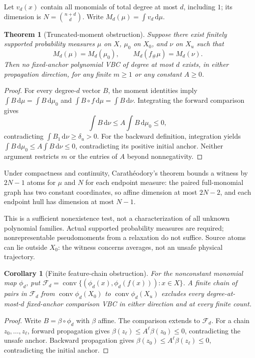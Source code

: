 \documentclass[journal,10pt]{IEEEtran}
\newtheorem{theorem}{Theorem}
\newtheorem{corollary}{Corollary}
\theoremstyle{definition}\newtheorem{definition}{Definition}
\theoremstyle{remark}
\newcommand{\co}{\operatorname{conv}}
\newcommand{\F}{\mathcal F_d}
\newcommand{\dd}{\,\mathrm d}
\begin{document}
Let $v_d(x)$ contain all monomials of total degree at most $d$, including $1$; its dimension is $N=\binom{n+d}{d}$. Write $M_d(\mu)=\int v_d\dd\mu$.
\begin{theorem}[Truncated-moment obstruction]\label{th:moment}
Suppose there exist finitely supported probability measures $\mu$ on $X$, $\mu_0$ on $X_0$, and $\nu$ on $X_u$ such that
\begin{equation}\label{eq:moments}
 M_d(\mu)=M_d(\mu_0),\qquad M_d(f_\#\mu)=M_d(\nu).
\end{equation}
Then no fixed-anchor polynomial VBC of degree at most $d$ exists, in either propagation direction, for any finite $m\geq1$ or any constant $A\geq0$.
\end{theorem}
\begin{proof}
For every degree-$d$ vector $B$, the moment identities imply $\int B\dd\mu=\int B\dd\mu_0$ and $\int B\circ f\dd\mu=\int B\dd\nu$. Integrating the forward comparison gives
\[
 \int B\dd\nu\leq A\int B\dd\mu_0\leq0,
\]
contradicting $\int B_1\dd\nu\geq\delta_u>0$. For the backward definition, integration yields $\int B\dd\mu_0\leq A\int B\dd\nu\leq0$, contradicting its positive initial anchor. Neither argument restricts $m$ or the entries of $A$ beyond nonnegativity.
\end{proof}


Under compactness and continuity, Carath\'eodory's theorem bounds a witness by $2N-1$ atoms for $\mu$ and $N$ for each endpoint measure: the paired full-monomial graph has two constant coordinates, so affine dimension at most $2N-2$, and each endpoint hull has dimension at most $N-1$.

This is a sufficient nonexistence test, not a characterization of all unknown polynomial families. Actual supported probability measures are required; nonrepresentable pseudomoments from a relaxation do not suffice. Source atoms can lie outside $X_0$: the witness concerns averages, not an unsafe physical trajectory.

\begin{corollary}[Finite feature-chain obstruction]\label{cor:chain}
For the nonconstant monomial map $\phi_d$, put $\F=\co\{(\phi_d(x),\phi_d(f(x))):x\in X\}$. A finite chain of pairs in $\F$ from $\co\phi_d(X_0)$ to $\co\phi_d(X_u)$ excludes every degree-at-most-$d$ fixed-anchor comparison VBC in either direction and at every finite count.
\end{corollary}
\begin{proof}
Write $B=\beta\circ\phi_d$ with $\beta$ affine. The comparison extends to $\F$. For a chain $z_0,\ldots,z_\ell$, forward propagation gives $\beta(z_\ell)\leq A^\ell\beta(z_0)\leq0$, contradicting the unsafe anchor. Backward propagation gives $\beta(z_0)\leq A^\ell\beta(z_\ell)\leq0$, contradicting the initial anchor.
\end{proof}
\end{document}
